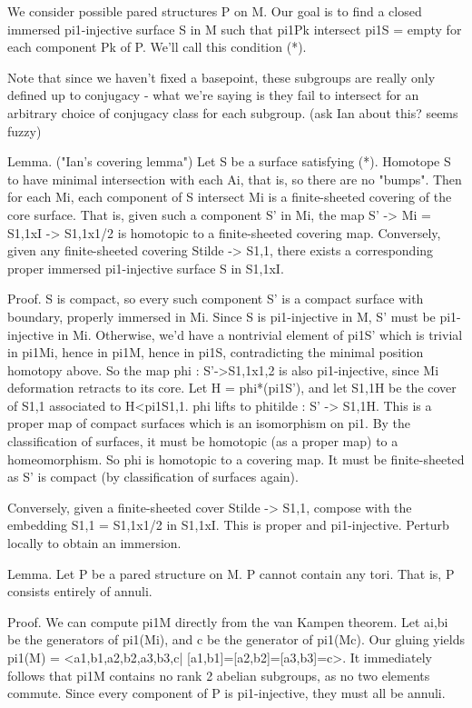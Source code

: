 \documentclass[12pt]{amsart}
\theoremstyle{definition}
\begin{document}
We consider possible pared structures P on M. Our goal is to find a closed
immersed pi1-injective surface S in M such that pi1Pk intersect pi1S = empty
for each component Pk of P. We'll call this condition (*).

Note that since we
haven't fixed a basepoint, these subgroups are really only defined up to
conjugacy - what we're saying is they fail to intersect for an arbitrary choice
of conjugacy class for each subgroup. (ask Ian about this? seems fuzzy)

Lemma. ("Ian's covering lemma") Let S be a surface satisfying (*). Homotope
S to have minimal intersection with each Ai, that is, so there are no "bumps".
Then for each Mi, each component of S intersect Mi is a finite-sheeted covering
of the core surface. That is, given such a component S' in Mi, the map S' -> Mi
= S1,1xI -> S1,1x{1/2} is homotopic to a finite-sheeted covering
map. Conversely, given any finite-sheeted covering Stilde -> S1,1, there
exists a corresponding proper immersed pi1-injective surface S in S1,1xI.

Proof. S is compact, so every such component S' is a compact surface with
boundary, properly immersed in Mi. Since S is pi1-injective in M, S' must be
pi1-injective in Mi. Otherwise, we'd have a nontrivial element of pi1S' which
is trivial in pi1Mi, hence in pi1M, hence in pi1S, contradicting the minimal
position homotopy above. So the map phi : S'->S1,1x{1,2} is also pi1-injective,
since Mi deformation retracts to its core. Let H = phi*(pi1S'), and let S1,1H
be the cover of S1,1 associated to H<pi1S1,1. phi lifts to phitilde : S' ->
S1,1H. This is a proper map of compact surfaces which is an isomorphism on pi1.
By the classification of surfaces, it must be homotopic (as a proper map) to
a homeomorphism. So phi is homotopic to a covering map. It must be
finite-sheeted as S' is compact (by classification of surfaces again).

Conversely, given a finite-sheeted cover Stilde -> S1,1, compose with the
embedding S1,1 = S1,1x{1/2} in S1,1xI. This is proper and pi1-injective.
Perturb locally to obtain an immersion.

Lemma. Let P be a pared structure on M. P cannot contain any tori. That is,
P consists entirely of annuli.

Proof. We can compute pi1M directly from the van Kampen theorem. Let ai,bi be
the generators of pi1(Mi), and c be the generator of pi1(Mc). Our gluing yields
pi1(M) = <a1,b1,a2,b2,a3,b3,c| [a1,b1]=[a2,b2]=[a3,b3]=c>. It immediately
follows that pi1M contains no rank 2 abelian subgroups, as no two elements
commute. Since every component of P is pi1-injective, they must all be annuli.
\end{document}
